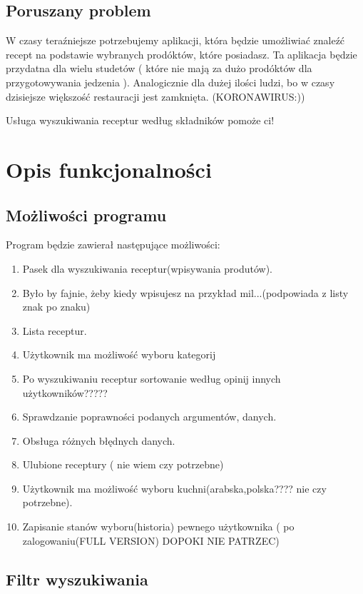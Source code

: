\documentclass[a4paper, 12pt]{article}
\begin{document}
		\subsection{Poruszany problem}
			\hspace*{1cm} W czasy teraźniejsze potrzebujemy aplikacji, która będzie umożliwiać znaleźć recept na podstawie wybranych prodóktów, które posiadasz. 
			Ta aplikacja będzie przydatna dla wielu studetów ( które nie mają za dużo  prodóktów dla przygotowywania jedzenia ). Analogicznie dla dużej ilości ludzi, bo w czasy dzisiejsze większość restauracji jest zamknięta. (KORONAWIRUS:)) 
			
Usługa wyszukiwania receptur według składników pomoże ci!
\newpage
	\section{Opis funkcjonalności}
		\subsection{Możliwości programu}
			\hspace*{1cm} Program będzie zawierał następujące możliwości:
		
 		\begin{enumerate}
 		    \item Pasek dla wyszukiwania receptur(wpisywania produtów).
 		    \item Było by fajnie, żeby kiedy wpisujesz na przykład mil...(podpowiada z listy znak po znaku)
 		    \item Lista receptur.
 			\item Użytkownik ma możliwość wyboru kategorij 
 			\item Po wyszukiwaniu receptur sortowanie według opinij innych użytkowników?????
 			\item Sprawdzanie poprawności podanych argumentów, danych.
 			\item Obsługa różnych błędnych danych.
 			\item Ulubione receptury ( nie wiem czy potrzebne) 
 			\item Użytkownik ma możliwość wyboru kuchni(arabska,polska???? nie czy potrzebne).
  			\item Zapisanie stanów wyboru(historia) pewnego użytkownika ( po zalogowaniu(FULL VERSION) DOPOKI NIE PATRZEC)
 		\end{enumerate}
 		\subsection{Filtr wyszukiwania}
\end{document}
